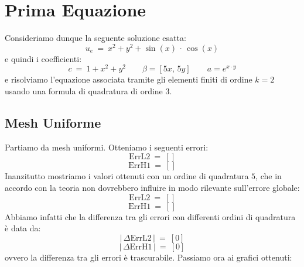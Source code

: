\documentclass[12pt,a4paper]{report}
\theoremstyle{theorem}
\theoremstyle{theorem}
\theoremstyle{definition}
\providecommand{\abs}[1]{\lvert \, #1 \, \rvert}
\begin{document}
\section{Prima Equazione}
Consideriamo dunque la seguente soluzione esatta:
\[ u_e \ = \ x^2 + y^2 + \sin(x) \, \cdot \, \cos(x) \]
e quindi i coefficienti:
\[ c \ = \ 1 + x^2 + y^2 \qquad \beta = [5x, \, 5y] \qquad a = e^{x \cdot y} \]
e risolviamo l'equazione associata tramite gli elementi finiti di ordine $k = 2$ usando una formula di quadratura di ordine $3$. 

\subsection{Mesh Uniforme}
Partiamo da mesh uniformi. Otteniamo i seguenti errori:
\[ \text{ErrL2} \ = \ [] \]
\[ \text{ErrH1} \ = \ [] \]
Inanzitutto mostriamo i valori ottenuti con un ordine di quadratura $5$, che in accordo con la teoria non dovrebbero influire in modo rilevante sull'errore globale:
\[ \text{ErrL2} \ = \ [] \]
\[ \text{ErrH1} \ = \ [] \]
Abbiamo infatti che la differenza tra gli errori con differenti ordini di quadratura è data da:
\[ \abs{ \Delta \text{ErrL2}} \ = \ [0] \]
\[ \abs{ \Delta \text{ErrH1}} \ = \ [0] \]
ovvero la differenza tra gli errori è trascurabile. Passiamo ora ai grafici ottenuti:
\end{document}
